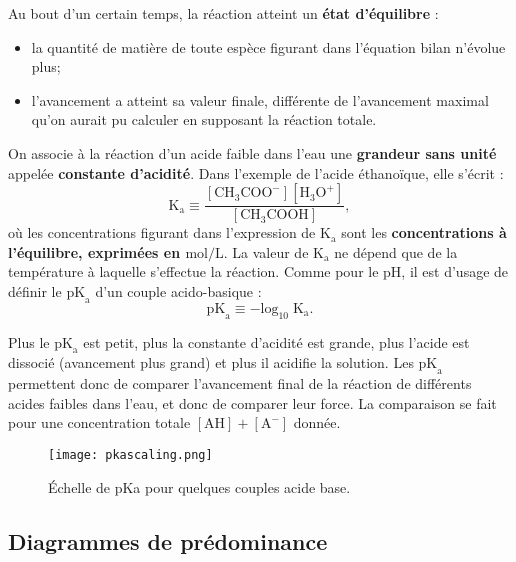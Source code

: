 \documentclass[11pt,a4paper]{report}
\begin{document}
Au bout d'un certain temps, la réaction atteint un \textbf{état d'équilibre} : 
\begin{itemize}
	\item la quantité de matière de toute espèce figurant dans l'équation bilan n'évolue plus;
	\item l'avancement a atteint sa valeur finale, différente de l'avancement maximal qu'on aurait pu 	calculer en supposant la réaction totale.\\
\end{itemize}

On associe à la réaction d'un acide faible dans l'eau une \textbf{grandeur sans unité} appelée \textbf{constante d'acidité}. Dans l'exemple de l'acide éthanoïque, elle s'écrit :
\begin{equation}
	\boxed{\text{K}_\text{a} \equiv \frac{[\text{CH}_3\text{COO}^-][\text{H}_3\text{O}^+]}
	{[\text{CH}_3\text{COOH}]}},
\end{equation}
où les concentrations figurant dans l'expression de $\text{K}_\text{a}$ sont les \textbf{concentrations à l'équilibre, exprimées en $\text{mol}/\text{L}$}. La valeur de $\text{K}_\text{a}$ ne dépend que de la température à laquelle s'effectue la réaction. Comme pour le pH, il est d'usage de définir le $\text{pK}_\text{a}$ d'un couple acido-basique :
\begin{equation}
	\boxed{\text{pK}_\text{a} \equiv -\text{log}_{10}\;\text{K}_\text{a}}.
\end{equation}

Plus le $\text{pK}_\text{a}$ est petit, plus la constante d'acidité est grande, plus l'acide est dissocié (avancement plus grand) et plus il acidifie la solution. Les $\text{pK}_\text{a}$ permettent donc de comparer l'avancement final de la réaction de différents acides faibles dans l'eau, et donc de comparer leur force. La comparaison se fait pour une concentration totale $[\text{AH}] + [\text{A}^-]$ donnée.

\begin{figure}[h!]
	\begin{center}
  		\texttt{[image: pkascaling.png]}
	\caption{Échelle de pKa pour quelques couples acide base.}
	\end{center}
\end{figure}

\subsection{Diagrammes de prédominance}
\end{document}
